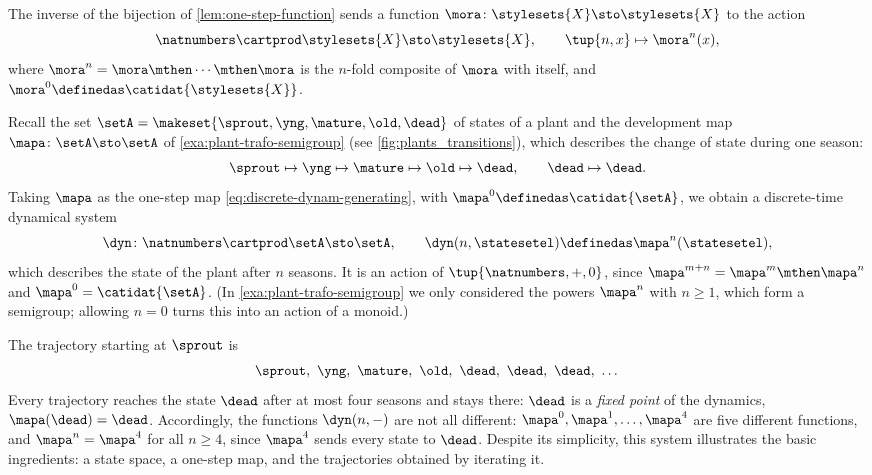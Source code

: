 \begin{remark}
\label{rem:one-step-function-inverse}
The inverse of the bijection of \cref{lem:one-step-function} sends a function $\mora \colon \stylesets{X} \sto \stylesets{X}$ to the action
\begin{equation}
    \natnumbers \cartprod \stylesets{X} \sto \stylesets{X}, \qquad \tup{n, x} \mapsto \mora^n(x),
\end{equation}
where $\mora^n = \mora \mthen \cdots \mthen \mora$ is the $n$-fold composite of $\mora$ with itself, and $\mora^0 \definedas \catidat{\stylesets{X}}$.
\end{remark}

\begin{example}
    \label{exa:plant-dynamical-system}
    Recall the set $\setA = \makeset{\sprout, \yng, \mature, \old, \dead}$ of states of a plant and the development map $\mapa \colon \setA \sto \setA$ of \cref{exa:plant-trafo-semigroup} (see \cref{fig:plants_transitions}), which describes the change of state during one season:
    \begin{equation}
        \sprout \mapsto \yng \mapsto \mature \mapsto \old \mapsto \dead, \qquad \dead \mapsto \dead.
    \end{equation}
    Taking $\mapa$ as the one-step map \cref{eq:discrete-dynam-generating}, with $\mapa^0 \definedas \catidat{\setA}$, we obtain a discrete-time dynamical system
    \begin{equation}
        \dyn \colon \natnumbers \cartprod \setA \sto \setA, \qquad \dyn(n, \statesetel) \definedas \mapa^n(\statesetel),
    \end{equation}
    which describes the state of the plant after $n$ seasons.
    It is an action of $\tup{\natnumbers, +, 0}$, since $\mapa^{m+n} = \mapa^m \mthen \mapa^n$ and $\mapa^0 = \catidat{\setA}$.
    (In \cref{exa:plant-trafo-semigroup} we only considered the powers $\mapa^n$ with $n \geq 1$, which form a semigroup; allowing $n = 0$ turns this into an action of a monoid.)

    The trajectory starting at $\sprout$ is
    \begin{equation}
        \sprout, \ \yng, \ \mature, \ \old, \ \dead, \ \dead, \ \dead, \ \dots
    \end{equation}
    Every trajectory reaches the state $\dead$ after at most four seasons and stays there: $\dead$ is a \emph{fixed point} of the dynamics, $\mapa(\dead) = \dead$.
    Accordingly, the functions $\dyn(n, -)$ are not all different: $\mapa^0, \mapa^1, \dots, \mapa^4$ are five different functions, and $\mapa^n = \mapa^4$ for all $n \geq 4$, since $\mapa^4$ sends every state to $\dead$.
    Despite its simplicity, this system illustrates the basic ingredients: a state space, a one-step map, and the trajectories obtained by iterating it.
\end{example}




